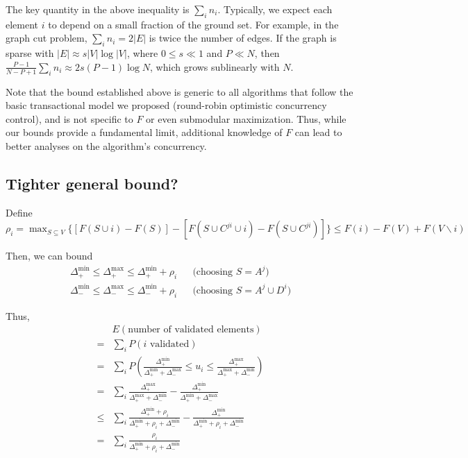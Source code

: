 The key quantity in the above inequality is $\sum_i n_i$.
Typically, we expect each element $i$ to depend on a small fraction of the ground set.
For example, in the graph cut problem, $\sum_i n_i = 2|E|$ is twice the number of edges.
If the graph is sparse with $|E|\approx s|V|\log|V|$, where $0\leq s\ll 1$ and $P\ll N$, then $\frac{P-1}{N-P+1}\sum_i n_i \approx 2s(P-1)\log N$, which grows sublinearly with $N$.

Note that the bound established above is generic to all algorithms that follow the basic transactional model we proposed (round-robin optimistic concurrency control), and is not specific to $F$ or even submodular maximization.
Thus, while our bounds provide a fundamental limit, additional knowledge of $F$ can lead to better analyses on the algorithm's concurrency.




\subsection{Tighter general bound?}
Define $\rho_i = \max_{S\subseteq V} \{[F(S\cup i) - F(S)] - [F(S \cup C^{ji} \cup i) - F(S \cup C^{ji})]\} \leq F(i) - F(V) + F(V\backslash i)$


Then, we can bound
\begin{align*}
\Delta_+^{\min} \leq \Delta_+^{\max} \leq \Delta_+^{\min} + \rho_i && \text{(choosing $S=A^j$)}\\
\Delta_-^{\min} \leq \Delta_-^{\max} \leq \Delta_-^{\min} + \rho_i && \text{(choosing $S=A^j\cup D^i$)}
\end{align*}

Thus,
\begin{align*}
&E(\text{number of validated elements})\\
=& \sum_i P(i \text{ validated})\\
=& \sum_i P\left(\frac{\Delta_+^{\min}}{\Delta_+^{\min} + \Delta_-^{\max}} \leq u_i \leq \frac{\Delta_+^{\max}}{\Delta_+^{\max} + \Delta_-^{\min}}\right)\\
=& \sum_i\frac{\Delta_+^{\max}}{\Delta_+^{\max} + \Delta_-^{\min}} - \frac{\Delta_+^{\min}}{\Delta_+^{\min} + \Delta_-^{\max}}\\
\leq& \sum_i\frac{\Delta_+^{\min}+\rho_i}{\Delta_+^{\min} + \rho_i + \Delta_-^{\min}} - \frac{\Delta_+^{\min}}{\Delta_+^{\min} + \rho_i + \Delta_-^{\min}}\\
=& \sum_i\frac{\rho_i}{\Delta_+^{\min} + \rho_i + \Delta_-^{\min}}
\end{align*}




